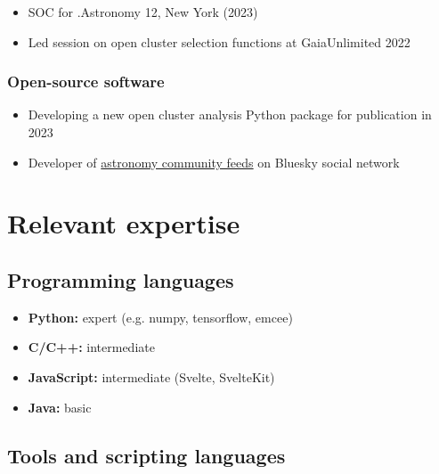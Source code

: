 \documentclass[12pt, letterpaper]{hunt-cv}
\begin{document}
\begin{itemize}
    \item SOC for .Astronomy 12, New York (2023)
    \item Led session on open cluster selection functions at GaiaUnlimited 2022
\end{itemize}

\subsubsection*{Open-source software \href{\cvGitHubLink}{\faGithub}}

\begin{itemize}
    \item Developing a new open cluster analysis Python package for publication in 2023
    \item Developer of \href{https://github.com/emilyhunt/bluesky-astronomy-feeds}{astronomy community feeds} on Bluesky social network
\end{itemize}





\section*{Relevant expertise}

\subsection*{Programming languages}

\begin{itemize}
    \item \textbf{Python:} expert (e.g. numpy, tensorflow, emcee)
    \item \textbf{C/C++:} intermediate
    \item \textbf{JavaScript:} intermediate (Svelte, SvelteKit)
    \item \textbf{Java:} basic
\end{itemize}

\subsection*{Tools and scripting languages}
\end{document}
